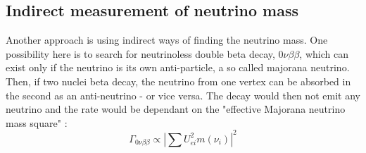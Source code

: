     \subsection{Indirect measurement of neutrino mass}
    \label{ch:Introduction:sec:Massive neutrino:subsec:indirect Neutrino Mass measurement}
    Another approach is using indirect ways of finding the neutrino mass. One possibility here is to search for neutrinoless double beta decay, $0\nu\beta\beta$, which can exist only if the neutrino is its own anti-particle, a so called majorana neutrino. Then, if two nuclei beta decay, the neutrino from one vertex can be absorbed in the second as an anti-neutrino - or vice versa. The decay would then not emit any neutrino and the rate would be dependant on the "effective Majorana neutrino mass square" \cite{currentNeutrinoSearches}:
    \begin{equation}
    	\Gamma_{0\nu\beta\beta} \propto \left| \sum{U_{ei}^2m\left(\nu_i\right)}\right|^2
    \end{equation}

    
